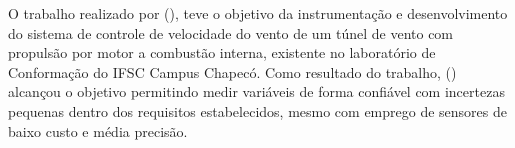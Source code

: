 O trabalho realizado por \citeauthor{hoss2018implantaccao} (\citeyear{hoss2018implantaccao}), teve o objetivo 
da instrumentação e desenvolvimento do sistema de controle de velocidade do vento de um túnel de vento com 
propulsão por motor a combustão interna, existente no laboratório de Conformação do IFSC Campus Chapecó.
Como resultado do trabalho, \citeauthor{hoss2018implantaccao} (\citeyear{hoss2018implantaccao}) alcançou o objetivo 
permitindo medir variáveis de forma confiável com incertezas pequenas dentro dos requisitos estabelecidos, mesmo 
com emprego de sensores de baixo custo e média precisão.
